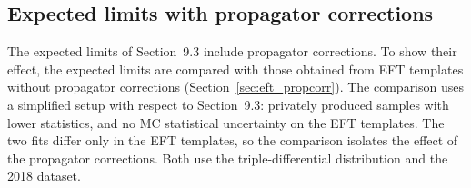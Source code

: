 %
%

\subsection{Expected limits with propagator corrections}
\label{sec:results_propcorr}

The expected limits of Section~9.3
include propagator corrections. To show their effect, the expected limits are
compared with those obtained from EFT templates without propagator corrections
(Section~\ref{sec:eft_propcorr}). The comparison uses a simplified setup with
respect to Section~9.3: privately produced samples with lower
statistics, and no MC statistical uncertainty on the EFT templates. The two fits
differ only in the EFT templates, so the comparison isolates the effect of the
propagator corrections. Both use the triple-differential distribution and the
2018 dataset.

